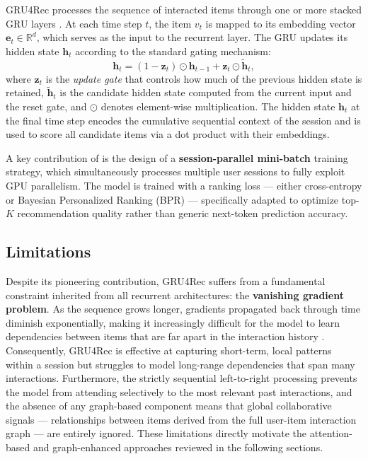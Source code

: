 \documentclass[12pt,a4paper]{report}
\newcommand{\textcite}[1]{\citet{#1}}
\newcommand{\parencite}[1]{\citep{#1}}
\begin{document}
GRU4Rec processes the sequence of interacted items through one or
more stacked GRU layers \parencite{hidasi2016gru4rec}. At each time
step $t$, the item $v_t$ is mapped to its embedding vector
$\mathbf{e}_t \in \mathbb{R}^d$, which serves as the input to the
recurrent layer. The GRU updates its hidden state $\mathbf{h}_t$
according to the standard gating mechanism:
\begin{equation}
  \mathbf{h}_t = (1 - \mathbf{z}_t) \odot \mathbf{h}_{t-1}
               + \mathbf{z}_t \odot \tilde{\mathbf{h}}_t,
\end{equation}
where $\mathbf{z}_t$ is the \textit{update gate} that controls how
much of the previous hidden state is retained, $\tilde{\mathbf{h}}_t$
is the candidate hidden state computed from the current input and the
reset gate, and $\odot$ denotes element-wise multiplication. The
hidden state $\mathbf{h}_t$ at the final time step encodes the
cumulative sequential context of the session and is used to score
all candidate items via a dot product with their embeddings.

A key contribution of \textcite{hidasi2016gru4rec} is the design of
a \textbf{session-parallel mini-batch} training strategy, which
simultaneously processes multiple user sessions to fully exploit GPU
parallelism. The model is trained with a ranking loss --- either
cross-entropy or Bayesian Personalized Ranking (BPR) --- specifically
adapted to optimize top-$K$ recommendation quality rather than
generic next-token prediction accuracy.

\subsection{Limitations}

Despite its pioneering contribution, GRU4Rec suffers from a
fundamental constraint inherited from all recurrent architectures:
the \textbf{vanishing gradient problem}. As the sequence grows
longer, gradients propagated back through time diminish
exponentially, making it increasingly difficult for the model to
learn dependencies between items that are far apart in the
interaction history \parencite{hidasi2016gru4rec}. Consequently,
GRU4Rec is effective at capturing short-term, local patterns within
a session but struggles to model long-range dependencies that span
many interactions. Furthermore, the strictly sequential left-to-right
processing prevents the model from attending selectively to the most
relevant past interactions, and the absence of any graph-based
component means that global collaborative signals --- relationships
between items derived from the full user-item interaction graph ---
are entirely ignored. These limitations directly motivate the
attention-based and graph-enhanced approaches reviewed in the
following sections.
\end{document}
